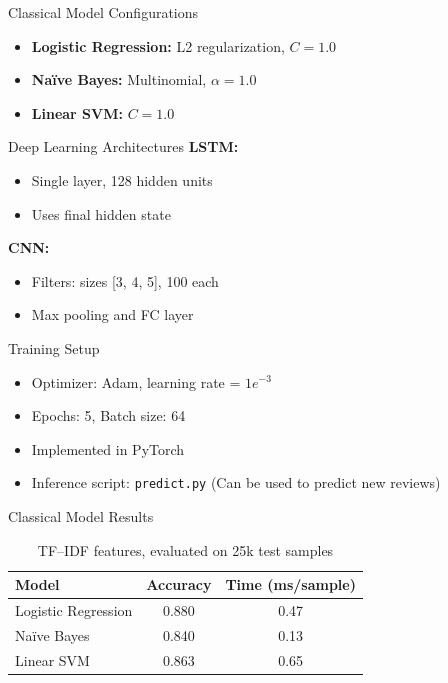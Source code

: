 \documentclass{beamer}
\begin{document}
\begin{frame}{Classical Model Configurations}
\begin{itemize}
  \item \textbf{Logistic Regression:} L2 regularization, $C = 1.0$
  \item \textbf{Naïve Bayes:} Multinomial, $\alpha = 1.0$
  \item \textbf{Linear SVM:} $C = 1.0$
\end{itemize}
\end{frame}

\begin{frame}{Deep Learning Architectures}
\textbf{LSTM:}
\begin{itemize}
  \item Single layer, 128 hidden units
  \item Uses final hidden state
\end{itemize}

\vspace{1em}
\textbf{CNN:}
\begin{itemize}
  \item Filters: sizes [3, 4, 5], 100 each
  \item Max pooling and FC layer
\end{itemize}
\end{frame}

\begin{frame}{Training Setup}
\begin{itemize}
  \item Optimizer: Adam, learning rate = $1e^{-3}$
  \item Epochs: 5, Batch size: 64
  \item Implemented in PyTorch
  \item Inference script: \texttt{predict.py} (Can be used to predict new reviews)
\end{itemize}
\end{frame}

\begin{frame}{Classical Model Results}
\begin{table}[H]
\centering
\begin{tabular}{lcc}
\toprule
\textbf{Model} & \textbf{Accuracy} & \textbf{Time (ms/sample)} \\
\midrule
Logistic Regression & 0.880 & 0.47 \\
Naïve Bayes & 0.840 & 0.13 \\
Linear SVM & 0.863 & 0.65 \\
\bottomrule
\end{tabular}
\caption*{TF–IDF features, evaluated on 25k test samples}
\end{table}
\end{frame}
\end{document}
